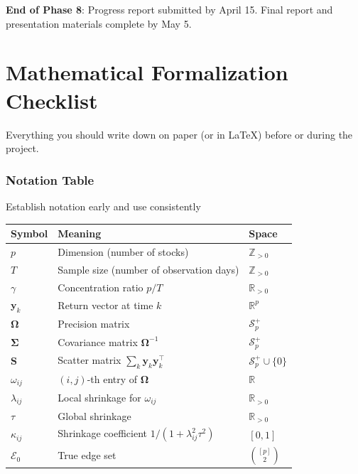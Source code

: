 \documentclass[11pt,a4paper]{article}
\newcommand{\R}{\mathbb{R}}
\newcommand{\Spp}{\mathcal{S}^{+}_p}
\newcommand{\bOmega}{\bm{\Omega}}
\newcommand{\bSigma}{\bm{\Sigma}}
\begin{document}
\begin{milestone}
\textbf{End of Phase 8}: Progress report submitted by April 15. Final report and presentation materials complete by May 5.
\end{milestone}


\part{Mathematical Formalization Checklist}

Everything you should write down on paper (or in LaTeX) before or during the project.

\section{Notation Table}

\begin{action}{Establish notation early and use consistently}
\begin{center}
\begin{tabular}{@{}lll@{}}
\toprule
\textbf{Symbol} & \textbf{Meaning} & \textbf{Space} \\
\midrule
$p$ & Dimension (number of stocks) & $\mathbb{Z}_{>0}$ \\
$T$ & Sample size (number of observation days) & $\mathbb{Z}_{>0}$ \\
$\gamma$ & Concentration ratio $p/T$ & $\R_{>0}$ \\
$\bm{y}_k$ & Return vector at time $k$ & $\R^p$ \\
$\bOmega$ & Precision matrix & $\Spp$ \\
$\bSigma$ & Covariance matrix $\bOmega^{-1}$ & $\Spp$ \\
$\bm{S}$ & Scatter matrix $\sum_k \bm{y}_k\bm{y}_k^\top$ & $\mathcal{S}^+_p \cup \{0\}$ \\
$\omega_{ij}$ & $(i,j)$-th entry of $\bOmega$ & $\R$ \\
$\lambda_{ij}$ & Local shrinkage for $\omega_{ij}$ & $\R_{>0}$ \\
$\tau$ & Global shrinkage & $\R_{>0}$ \\
$\kappa_{ij}$ & Shrinkage coefficient $1/(1+\lambda_{ij}^2\tau^2)$ & $[0,1]$ \\
$\mathcal{E}_0$ & True edge set & $\binom{[p]}{2}$ \\
\bottomrule
\end{tabular}
\end{center}
\end{action}
\end{document}
